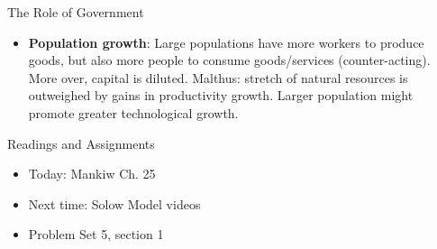 \documentclass[xcolor={dvipsnames},pdf, hyperref={colorlinks=true, citecolor=ForestGreen, linkcolor=BlueViolet, urlcolor=Magenta}]{beamer}
\theoremstyle{definition}
\begin{document}
\begin{frame}{The Role of Government}
\begin{itemize}

\item \textbf{Population growth}: Large populations have more workers to produce goods, but also more people to consume goods/services (counter-acting). More over, capital is diluted. Malthus: stretch of natural resources is outweighed by gains in productivity growth. Larger population might promote greater technological growth.
\end{itemize}
\end{frame}

\begin{frame}{Readings and Assignments}
\begin{itemize}
	\item Today: Mankiw Ch. 25
	\item Next time: Solow Model videos
	\item Problem Set 5, section 1
\end{itemize}
\end{frame}
\end{document}
